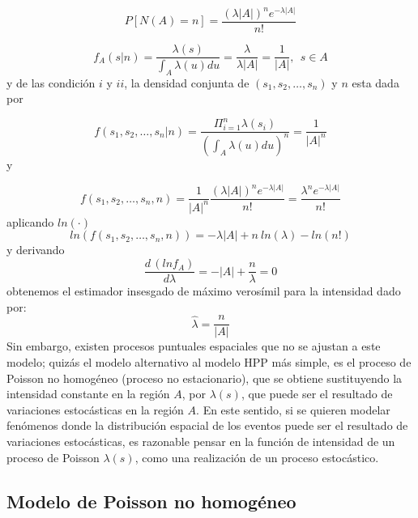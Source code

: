 \documentclass[12pt]{report}
\begin{document}
		
		
		\[P [ N(A)  = n] =  \frac{ (\lambda|A|)^{n} e^{-\lambda|A| }}{n!  } \]   
		
		
		
		
		\[f_{A}(s|n ) = \frac{\lambda(s)  }{ \int_{A} \lambda(u) du  }  = \frac{\lambda  }{ \lambda|A| } = \frac{1 }{ |A| }, \: \:  s \in A\]   y de las condición $i$ y $ii$,  la densidad conjunta  de $ (s_{1}, s_{2},\dots, s_{n} )$  y $n$ esta dada por 
		
		
		
		
		\[f(s_{1}, s_{2},\dots, s_{n}| n ) = \frac{ \Pi^{n}_{i=1}\lambda(s_{i})  }{( \int_{A} \lambda(u) du )^{n} } = \frac{1 }{ |A|^{n} } \]  y
		
 
		
		\[f(s_{1}, s_{2},\dots, s_{n}, n ) = \frac{1 }{ |A|^{n} } \frac{ (\lambda|A|)^{n} e^{-\lambda|A| }}{n!  } =  \frac{ \lambda^{n} e^{-\lambda|A| }}{n!  } \] 	aplicando $ln(\cdot)$ 
		\[ ln(f(s_{1}, s_{2},\dots, s_{n}, n )) =   -\lambda |A| + n \: ln(\lambda) - ln(n!)   \] y derivando 
		\[ \frac{ d\, (ln f_{A})}{d \lambda } =   - |A| +\frac{n}{\lambda}  =0 \] obtenemos el estimador insesgado  de máximo verosímil para la intensidad  dado por:  \[\hat{\lambda} =\frac{n}{|A|} \]   Sin embargo,  existen procesos puntuales espaciales que no se ajustan a este modelo; quizás el modelo alternativo al modelo HPP más simple,  es el proceso de Poisson no homogéneo (proceso no  estacionario),  que se obtiene sustituyendo la intensidad constante en la región $A$,  por   $\lambda(s)$, que  puede ser el resultado de variaciones estocásticas en la región $A$. En este sentido, si se quieren modelar fenómenos donde la distribución espacial de los eventos puede ser el resultado de variaciones estocásticas, es razonable pensar en la función de intensidad de un proceso de Poisson   $\lambda(s)$,  como una realización de un proceso estocástico.
		
		
		\subsection{Modelo de Poisson no homogéneo}{\label{Poisson3}}
		
\end{document}
